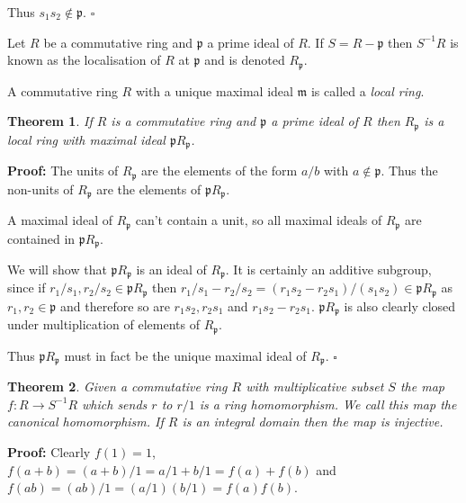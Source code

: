 \documentclass[10pt]{article}
\newcommand{\qed}{\square}
\newtheorem{theorem}{Theorem}[section]
\newenvironment{definition}[1][Definition]{\begin{trivlist}
\item[\hskip \labelsep {\bfseries #1}]}{\end{trivlist}}
\begin{document}
Thus $s_1s_2 \notin \mathfrak{p}$. $\qed$

\begin{definition}
Let $R$ be a commutative ring and $\mathfrak{p}$ a prime ideal of $R$. If $S = R - \mathfrak{p}$ then $S^{-1}R$ is known as the localisation of $R$ at $\mathfrak{p}$ and is denoted $R_{\mathfrak{p}}$.
\end{definition}

\begin{definition}
A commutative ring $R$ with a unique maximal ideal $\mathfrak{m}$ is called a \emph{local ring}.
\end{definition}

\begin{theorem}
If $R$ is a commutative ring and $\mathfrak{p}$ a prime ideal of $R$ then $R_{\mathfrak{p}}$ is a local ring with maximal ideal $\mathfrak{p}R_{\mathfrak{p}}$.
\end{theorem}

\textbf{Proof:} The units of $R_{\mathfrak{p}}$ are the elements of the form $a/b$ with $a \notin \mathfrak{p}$. Thus the non-units of $R_{\mathfrak{p}}$ are the elements of $\mathfrak{p}R_{\mathfrak{p}}$.

A maximal ideal of $R_{\mathfrak{p}}$ can't contain a unit, so all maximal ideals of $R_{\mathfrak{p}}$ are contained in $\mathfrak{p}R_{\mathfrak{p}}$.

We will show that $\mathfrak{p}R_{\mathfrak{p}}$ is an ideal of $R_{\mathfrak{p}}$. It is certainly an additive subgroup, since if $r_1/s_1, r_2/s_2 \in \mathfrak{p}R_{\mathfrak{p}}$ then $r_1/s_1 - r_2/s_2 = (r_1s_2 - r_2s_1)/(s_1s_2) \in \mathfrak{p}R_{\mathfrak{p}}$ as $r_1, r_2 \in \mathfrak{p}$ and therefore so are $r_1s_2, r_2s_1$ and $r_1s_2 - r_2s_1$. $\mathfrak{p}R_{\mathfrak{p}}$ is also clearly closed under multiplication of elements of $R_{\mathfrak{p}}$.

Thus $\mathfrak{p}R_{\mathfrak{p}}$ must in fact be the unique maximal ideal of $R_{\mathfrak{p}}$. $\qed$

\begin{theorem}
Given a commutative ring $R$ with multiplicative subset $S$ the map $f : R \to S^{-1}R$ which sends $r$ to $r/1$ is a ring homomorphism. We call this map the \emph{canonical homomorphism}. If $R$ is an integral domain then the map is injective.
\end{theorem}

\textbf{Proof:} Clearly $f(1) = 1$, $f(a + b) = (a + b)/1 = a/1 + b/1 = f(a) + f(b)$ and $f(ab) = (ab)/1 = (a/1)(b/1) = f(a)f(b)$.
\end{document}
